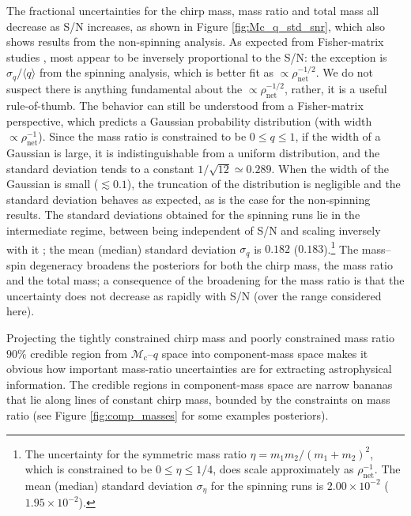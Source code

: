 The fractional uncertainties for the chirp mass, mass ratio and total mass all decrease as S/N increases, as shown in Figure \ref{fig:Mc_q_std_snr}, which also shows results from the non-spinning analysis. As expected from Fisher-matrix studies \citep[e.g.,][]{FinnChernoff}, most appear to be inversely proportional to the S/N: the exception is $\sigma_q/\langle q\rangle$ from the spinning analysis, which is better fit as $\propto \rho_\mathrm{net}^{-1/2}$. We do not suspect there is anything fundamental about the $\propto \rho_\mathrm{net}^{-1/2}$, rather, it is a useful rule-of-thumb. The behavior can still be understood from a Fisher-matrix perspective, which predicts a Gaussian probability distribution (with width $\propto \rho_\mathrm{net}^{-1}$). Since the mass ratio is constrained to be $0 \leq q \leq 1$, if the width of a Gaussian is large, it is indistinguishable from a uniform distribution, and the standard deviation tends to a constant $1/\sqrt{12} \simeq 0.289$. When the width of the Gaussian is small ($\lesssim 0.1$), the truncation of the distribution is negligible and the standard deviation behaves as expected, as is the case for the non-spinning results. The standard deviations obtained for the spinning runs lie in the intermediate regime, between being independent of S/N and scaling inversely with it \citep[cf.][]{Littenberg:2015tpa}; the mean (median) standard deviation $\sigma_q$ is $0.182$ ($0.183$).\footnote{The uncertainty  for the symmetric mass ratio $\eta = m_1m_2/(m_1 + m_2)^2$, which is constrained to be $0 \leq \eta \leq 1/4$, does scale approximately as $\rho_\mathrm{net}^{-1}$. The mean (median) standard deviation $\sigma_\eta$ for the spinning runs is $2.00\times 10^{-2}$ ($1.95\times 10^{-2}$).} The mass--spin degeneracy broadens the posteriors for both the chirp mass, the mass ratio and the total mass; a consequence of the broadening for the mass ratio is that the uncertainty does not decrease as rapidly with S/N (over the range considered here).
  
Projecting the tightly constrained chirp mass and poorly constrained mass ratio $90\%$ credible region from $\mathcal{M}_\mathrm{c}$--$q$ space into component-mass space makes it obvious how important mass-ratio uncertainties are for extracting astrophysical information.  The credible regions in component-mass space are narrow bananas that lie along lines of constant chirp mass, bounded by the constraints on mass ratio (see Figure \ref{fig:comp_masses} for some examples posteriors).
  
  
  
  
  
  
  
  
  
  
  
  